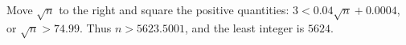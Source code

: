 Move $\sqrt n$ to the right and square the positive quantities: $3<0.04\sqrt n+0.0004$, or $\sqrt n>74.99$. Thus $n>5623.5001$, and the least integer is $\boxed{5624}$.

